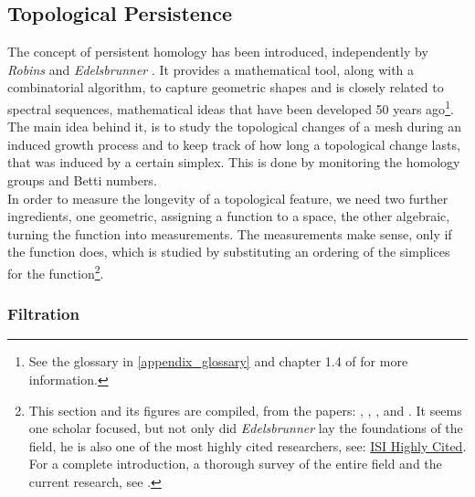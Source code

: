 \subsection{Topological Persistence}
\label{math_topological_persistance}

The concept of persistent homology has been introduced, independently by \textit{Robins} \citep[][]{Robins1999} and \textit{Edelsbrunner} \citep[cf.][]{Edelsbrunner2000}.
It provides a mathematical tool, along with a combinatorial algorithm, to capture geometric shapes and is closely related to spectral sequences, mathematical ideas that have been developed 50 years ago\footnote{ See the glossary in \ref{appendix_glossary} and chapter 1.4 of \citep[][]{Zomorodian2005} for more information.}.\\
The main idea behind it, is to study the topological changes of a mesh during an induced growth process and to keep track of how long a topological change lasts, that was induced by a  certain simplex.
This is done by monitoring the homology groups and Betti numbers.\\
In order to measure the longevity of a topological feature, we need two further ingredients, one geometric, assigning a function to a space, the other algebraic, turning the function into measurements.
The measurements make sense, only if the function does, which is studied by substituting an ordering of the simplices for the function\footnote{ This section and its figures are compiled, from the papers: \citep[cf.][]{Delfinado1995}, \citep[cf.][]{Edelsbrunner2000}, \citep[cf.][]{Edelsbrunner2001}, \citep[cf.][]{Zomorodian2008} and \citep[cf.][]{Edelsbrunner2006}. It seems one scholar focused, but not only did \textit{Edelsbrunner} lay the foundations of the field, he is also one of the most highly cited researchers, see: \href{http://researchanalytics.thomsonreuters.com/highlycited/categories/computer_science/}{ISI Highly Cited}. For a complete introduction, a thorough survey of the entire field and the current research, see \citep[][]{Kozlov2008}.}.

\subsubsection{Filtration}
\label{math_filtration}

